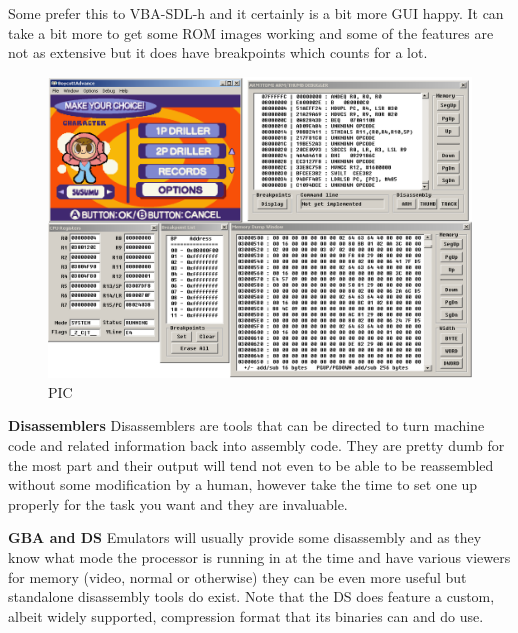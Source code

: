 \documentclass[
]{book}
\begin{document}
Some prefer this to VBA-SDL-h and it certainly is a bit more GUI happy. It can take a bit more to get some ROM images working and some of the features are not as extensive but it does have breakpoints which counts for a lot.

\begin{figure}
\centering
\includegraphics{images/17_home_fast6191_romhackingguide_unrenamed_file___ackingguideemulatorshowcaseboycottadvance_1.png}
\caption{PIC}
\end{figure}

\textbf{Disassemblers} Disassemblers are tools that can be directed to turn machine code and related information back into assembly code. They are pretty dumb for the most part and their output will tend not even to be able to be reassembled without some modification by a human, however take the time to set one up properly for the task you want and they are invaluable.

\textbf{GBA and DS} Emulators will usually provide some disassembly and as they know what mode the processor is running in at the time and have various viewers for memory (video, normal or otherwise) they can be even more useful but standalone disassembly tools do exist. Note that the DS does feature a custom, albeit widely supported, compression format that its binaries can and do use.
\end{document}
